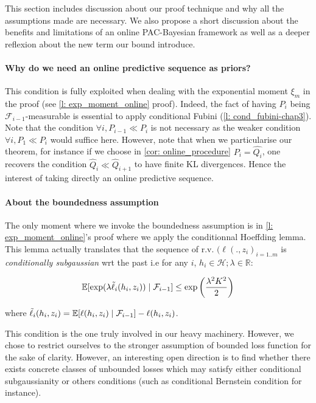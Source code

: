 This section includes discussion about our proof technique and why all the assumptions made are necessary. We also propose a short discussion about the benefits and limitations of an online PAC-Bayesian framework as well as a deeper reflexion about the new term our bound introduce.


\paragraph{Why do we need an online predictive sequence as priors? }

This condition is fully exploited when dealing with the exponential moment $\xi_m$ in the proof (see \cref{l: exp_moment_online} proof). Indeed, the fact of having $P_i$ being $\mathcal{F}_{i-1}$-measurable is essential to apply conditional Fubini (\cref{l: cond_fubini-chap3}). Note that the condition $\forall i , P_{i-1}\ll P_{i}$ is not necessary as the weaker condition $\forall i, P_1 \ll P_i$ would suffice here.
However, note that when we particularise our theorem, for instance if we choose in \cref{cor: online_procedure} $P_i= \hat{Q_i}$, one recovers the condition $\hat{Q}_{i}\ll\hat{Q}_{i+1}$ to have finite KL divergences. Hence the interest of taking directly an online predictive sequence.

\paragraph{About the boundedness assumption}

The only moment where we invoke the boundedness assumption is in \cref{l: exp_moment_online}'s proof where we apply the conditionnal Hoeffding lemma. This lemma actually translates that the sequence of r.v. $(\ell(.,z_i)_{i=1..m}$ is \emph{conditionally subgaussian} wrt the past i.e for any $i$, $h_i\in\mathcal{H}; \lambda\in\mathbb{R}$:

\[ \mathbb{E}[\exp(\lambda \Tilde{\ell}_i(h_i,z_i)) \mid \mathcal{F}_{i-1}] \leq \exp\left( \frac{\lambda^2K^2}{2}\right)\]

 where $\Tilde{\ell}_i(h_i,z_i)= \mathbb{E}[\ell(h_i,z_i)\mid \mathcal{F}_{i-1}]-  \ell(h_i,z_i)$.

 This condition is the one truly involved in our heavy machinery. However, we chose to restrict ourselves to the stronger assumption of bounded loss function for the sake of clarity. However, an interesting open direction is to find whether there exists concrete classes of unbounded losses which may satisfy either conditional subgaussianity or others conditions (such as conditional Bernstein condition for instance).


